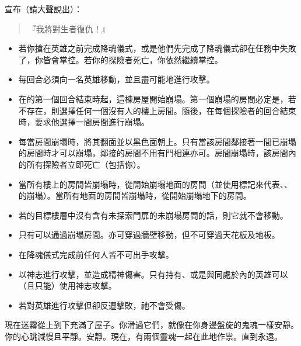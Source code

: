 宣布（請大聲說出）：
\begin{quote}
  『我將對生者復仇！』
\end{quote}

\vfill\null\pagebreak

\begin{itemize}
  \item 若你搶在英雄之前完成降魂儀式，或是他們先完成了降魂儀式卻在任務中失敗了，你皆會掌控。若你的探險者死亡，你依然繼續掌控。
  \item {}每回合必須向一名英雄移動，並且盡可能地進行攻擊。
  \item 在的第一個回合結束時起，這棟房屋開始崩塌。第一個崩塌的房間必定是，若不存在，則選擇任何一個沒有人的樓上房間。隨後，在每個探險者的回合結束時，要求他選擇一間房間進行崩塌。
  \item 每當房間崩塌時，將其翻面並以黑色面朝上。只有當該房間鄰接著一間已崩塌的房間時才可以崩塌，鄰接的房間不用有門相連亦可。房間崩塌時，該房間內的所有探險者立即死亡（包括你）。
  \item 當所有樓上的房間皆崩塌時，從開始崩塌地面的房間（並使用標記來代表、、的崩塌）。當所有地面的房間皆崩塌時，從開始崩塌地下的房間。
  \item 若的目標樓層中沒有含有未探索門扉的未崩塌房間的話，則它就不會移動。
  \item 只有可以通過崩塌房間。亦可穿過牆壁移動，但不可穿過天花板及地板。
\end{itemize}

\vspace*{-1em}
\begin{itemize}
  \item 在降魂儀式完成前任何人皆不可出手攻擊。\iffalse{如果英雄控制\Boss*{Ghost}，他們會告知你特殊攻擊規則。}\fi
  \item {}以神志進行攻擊，並造成精神傷害。只有持有、或是與同處於內的英雄可以（且只能）使用神志攻擊。
  \item 若對英雄進行攻擊但卻反遭擊敗，祂不會受傷。
\end{itemize}

\begin{HauntStory}
  現在迷霧從上到下充滿了屋子。你滑過它們，就像在你身邊盤旋的鬼魂一樣安靜。你的心跳減慢且平靜。安靜。現在，有兩個靈魂一起在此地作祟。直到永遠。
\end{HauntStory}
